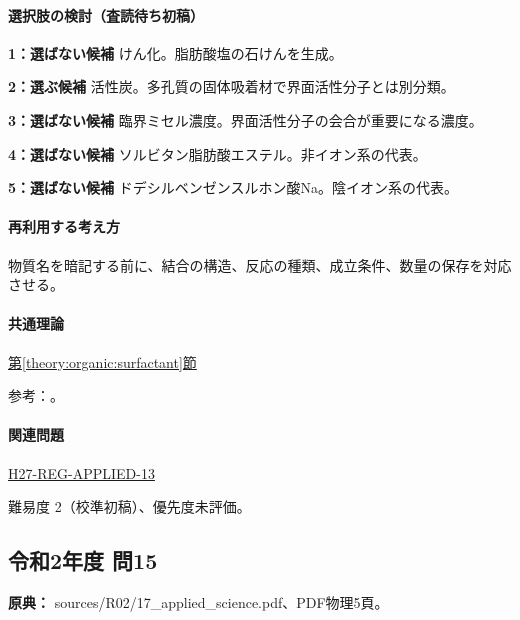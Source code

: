 \paragraph{選択肢の検討（査読待ち初稿）}\mbox{}\par

\noindent\textbf{1：選ばない候補} けん化。脂肪酸塩の石けんを生成。\par

\noindent\textbf{2：選ぶ候補} 活性炭。多孔質の固体吸着材で界面活性分子とは別分類。\par

\noindent\textbf{3：選ばない候補} 臨界ミセル濃度。界面活性分子の会合が重要になる濃度。\par

\noindent\textbf{4：選ばない候補} ソルビタン脂肪酸エステル。非イオン系の代表。\par

\noindent\textbf{5：選ばない候補} ドデシルベンゼンスルホン酸Na。陰イオン系の代表。\par

\paragraph{再利用する考え方} 物質名を暗記する前に、結合の構造、反応の種類、成立条件、数量の保存を対応させる。

\paragraph{共通理論} \hyperref[theory:organic:surfactant]{第\ref*{theory:organic:surfactant}節}

\par 参考：\cite{organic_cmc}。

\paragraph{関連問題} \hyperref[q:h27-reg-applied-13]{H27-REG-APPLIED-13}

\par 難易度 2（校準初稿）、優先度未評価。

\subsection{令和2年度 問15}
\label{q:r02-reg-applied-15}

\noindent\textbf{原典：} sources/R02/17\_applied\_science.pdf、PDF物理5頁。

